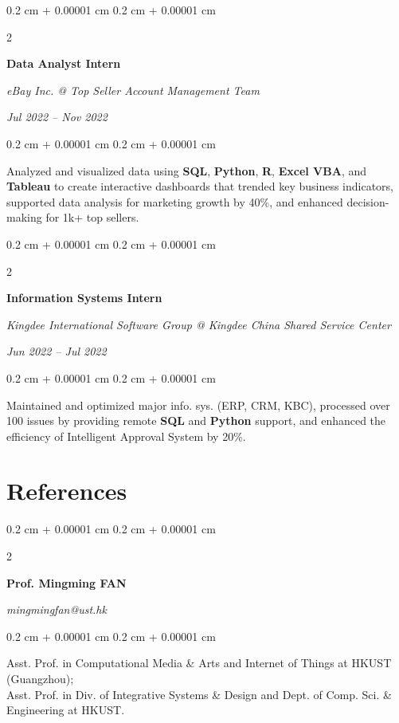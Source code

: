 \documentclass[10pt, letterpaper]{article}
\newenvironment{highlights}{
    \begin{itemize}[
        topsep=0.10 cm,
        parsep=0.10 cm,
        partopsep=0pt,
        itemsep=0pt,
        leftmargin=0.4 cm + 10pt
    ]
}{
    \end{itemize}
} %
\newenvironment{onecolentry}{
    \begin{adjustwidth}{
        0.2 cm + 0.00001 cm
    }{
        0.2 cm + 0.00001 cm
    }
}{
    \end{adjustwidth}
} %
\newenvironment{twocolentry}[2][]{
    \onecolentry
    \def\secondColumn{#2}
    \setcolumnwidth{\fill, 4.5 cm}
    \begin{paracol}{2}
}{
    \switchcolumn \raggedleft \secondColumn
    \end{paracol}
    \endonecolentry
} %
\begin{document}
        \begin{twocolentry}{
        \textit{Jul 2022 – Nov 2022}}
            \textbf{Data Analyst Intern}

            \textit{eBay Inc. @ Top Seller Account Management Team}
        \end{twocolentry}
        \begin{onecolentry}
            \begin{highlights}
                Analyzed and visualized data using \textbf{SQL}, \textbf{Python}, \textbf{R}, \textbf{Excel VBA}, and \textbf{Tableau} to create interactive dashboards that trended key business indicators, supported data analysis for marketing growth by 40\%, and enhanced decision-making for 1k+ top sellers.
            \end{highlights}
        \end{onecolentry}

        \vspace{0.2 cm}

        \begin{twocolentry}{
        \textit{Jun 2022 – Jul 2022}}
            \textbf{Information Systems Intern}

            \textit{Kingdee International Software Group @ Kingdee China Shared Service Center}
        \end{twocolentry}
        \begin{onecolentry}
            \begin{highlights}
                Maintained and optimized major info. sys. (ERP, CRM, KBC), processed over 100 issues by providing remote \textbf{SQL} and \textbf{Python} support, and enhanced the efficiency of Intelligent Approval System by 20\%.
            \end{highlights}
        \end{onecolentry}

    \section{References}

        \begin{twocolentry}{
            \textit{mingmingfan@ust.hk}}
                \textbf{Prof. Mingming FAN}
        \end{twocolentry}
        \begin{onecolentry}
            Asst. Prof. in Computational Media \& Arts and Internet of Things at HKUST (Guangzhou); \\
            Asst. Prof. in Div. of Integrative Systems \& Design and Dept. of Comp. Sci. \& Engineering at HKUST.
        \end{onecolentry}
\end{document}
